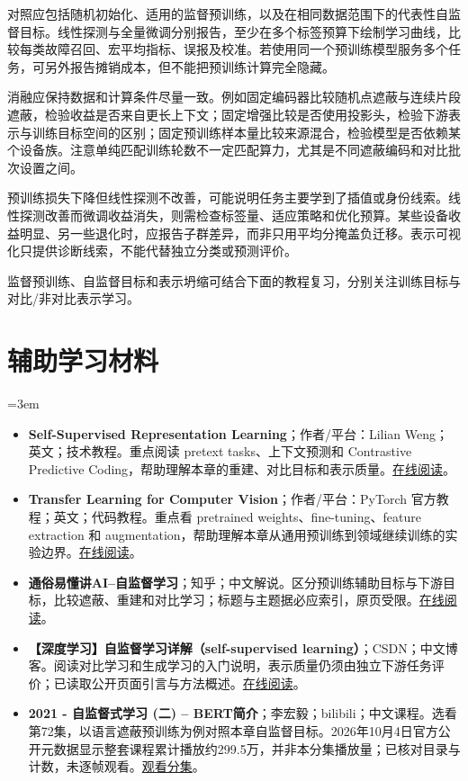 对照应包括随机初始化、适用的监督预训练，以及在相同数据范围下的代表性自监督目标。线性探测与全量微调分别报告，至少在多个标签预算下绘制学习曲线，比较每类故障召回、宏平均指标、误报及校准。若使用同一个预训练模型服务多个任务，可另外报告摊销成本，但不能把预训练计算完全隐藏。

消融应保持数据和计算条件尽量一致。例如固定编码器比较随机点遮蔽与连续片段遮蔽，检验收益是否来自更长上下文；固定增强比较是否使用投影头，检验下游表示与训练目标空间的区别；固定预训练样本量比较来源混合，检验模型是否依赖某个设备族。注意单纯匹配训练轮数不一定匹配算力，尤其是不同遮蔽编码和对比批次设置之间。

预训练损失下降但线性探测不改善，可能说明任务主要学到了插值或身份线索。线性探测改善而微调收益消失，则需检查标签量、适应策略和优化预算。某些设备收益明显、另一些退化时，应报告子群差异，而非只用平均分掩盖负迁移。表示可视化只提供诊断线索，不能代替独立分类或预测评价。

监督预训练、自监督目标和表示坍缩可结合下面的教程复习，分别关注训练目标与对比/非对比表示学习。
\section*{辅助学习材料}
\begingroup
\emergencystretch=3em
\begin{itemize}
\item \textbf{Self-Supervised Representation Learning}；作者/平台：Lilian Weng；英文；技术教程。重点阅读 pretext tasks、上下文预测和 Contrastive Predictive Coding，帮助理解本章的重建、对比目标和表示质量。\href{https://lilianweng.github.io/posts/2019-11-10-self-supervised/}{在线阅读}。
\item \textbf{Transfer Learning for Computer Vision}；作者/平台：PyTorch 官方教程；英文；代码教程。重点看 pretrained weights、fine-tuning、feature extraction 和 augmentation，帮助理解本章从通用预训练到领域继续训练的实验边界。\href{https://docs.pytorch.org/tutorials/beginner/transfer\_learning\_tutorial.html}{在线阅读}。
\item \textbf{通俗易懂讲AI--自监督学习}；知乎；中文解说。区分预训练辅助目标与下游目标，比较遮蔽、重建和对比学习；标题与主题据必应索引，原页受限。\href{https://zhuanlan.zhihu.com/p/676130861}{在线阅读}。
\item \textbf{【深度学习】自监督学习详解（self-supervised learning）}；CSDN；中文博客。阅读对比学习和生成学习的入门说明，表示质量仍须由独立下游任务评价；已读取公开页面引言与方法概述。\href{https://blog.csdn.net/qq\_51392112/article/details/128806998}{在线阅读}。
\item \textbf{2021 - 自监督式学习 (二) – BERT简介}；李宏毅；bilibili；中文课程。选看第72集，以语言遮蔽预训练为例对照本章自监督目标。2026年10月4日官方公开元数据显示整套课程累计播放约299.5万，并非本分集播放量；已核对目录与计数，未逐帧观看。\href{https://www.bilibili.com/video/BV1Wv411h7kN/?p=72}{观看分集}。
\end{itemize}
\endgroup
